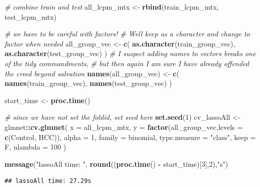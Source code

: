 \documentclass[
]{book}
\newenvironment{Shaded}{\begin{snugshade}}{\end{snugshade}}
\newcommand{\CommentTok}[1]{\textcolor[rgb]{0.56,0.35,0.01}{\textit{#1}}}
\newcommand{\DataTypeTok}[1]{\textcolor[rgb]{0.13,0.29,0.53}{#1}}
\newcommand{\DecValTok}[1]{\textcolor[rgb]{0.00,0.00,0.81}{#1}}
\newcommand{\KeywordTok}[1]{\textcolor[rgb]{0.13,0.29,0.53}{\textbf{#1}}}
\newcommand{\NormalTok}[1]{#1}
\newcommand{\OperatorTok}[1]{\textcolor[rgb]{0.81,0.36,0.00}{\textbf{#1}}}
\newcommand{\StringTok}[1]{\textcolor[rgb]{0.31,0.60,0.02}{#1}}
\begin{document}
\begin{Shaded}
\begin{Highlighting}[]
\CommentTok{\# combine train and test }
\NormalTok{all\_lcpm\_mtx <{-}}\StringTok{ }\KeywordTok{rbind}\NormalTok{(train\_lcpm\_mtx, test\_lcpm\_mtx)}

\CommentTok{\# we have to be careful with factors!}
\CommentTok{\# We\textquotesingle{}ll keep as a character and change to factor when needed}
\NormalTok{all\_group\_vec <{-}}\StringTok{ }\KeywordTok{c}\NormalTok{(}
 \KeywordTok{as.character}\NormalTok{(train\_group\_vec), }
 \KeywordTok{as.character}\NormalTok{(test\_group\_vec)}
\NormalTok{)}
\CommentTok{\# I suspect adding names to vectors breaks one of the tidy commandments,}
\CommentTok{\# but then again I am sure I have already offended the creed beyond salvation}
\KeywordTok{names}\NormalTok{(all\_group\_vec) <{-}}\StringTok{ }\KeywordTok{c}\NormalTok{(}
 \KeywordTok{names}\NormalTok{(train\_group\_vec),}
 \KeywordTok{names}\NormalTok{(test\_group\_vec)}
\NormalTok{)}

\NormalTok{start\_time <{-}}\StringTok{  }\KeywordTok{proc.time}\NormalTok{()}

\CommentTok{\# since we have not set the foldid, set seed here}
\KeywordTok{set.seed}\NormalTok{(}\DecValTok{1}\NormalTok{)}
\NormalTok{cv\_lassoAll <{-}}\StringTok{ }\NormalTok{glmnet}\OperatorTok{::}\KeywordTok{cv.glmnet}\NormalTok{(}
 \DataTypeTok{x =}\NormalTok{ all\_lcpm\_mtx,}
 \DataTypeTok{y =} \KeywordTok{factor}\NormalTok{(all\_group\_vec,}\DataTypeTok{levels =} \KeywordTok{c}\NormalTok{(}\StringTok{\textquotesingle{}Control\textquotesingle{}}\NormalTok{, }\StringTok{\textquotesingle{}HCC\textquotesingle{}}\NormalTok{)),}
 \DataTypeTok{alpha =} \DecValTok{1}\NormalTok{,}
 \DataTypeTok{family =} \StringTok{\textquotesingle{}binomial\textquotesingle{}}\NormalTok{,}
 \DataTypeTok{type.measure  =}  \StringTok{"class"}\NormalTok{,}
 \DataTypeTok{keep =}\NormalTok{ F,}
 \DataTypeTok{nlambda =} \DecValTok{100}
\NormalTok{)}

\KeywordTok{message}\NormalTok{(}\StringTok{"lassoAll time: "}\NormalTok{, }\KeywordTok{round}\NormalTok{((}\KeywordTok{proc.time}\NormalTok{() }\OperatorTok{{-}}\StringTok{ }\NormalTok{start\_time)[}\DecValTok{3}\NormalTok{],}\DecValTok{2}\NormalTok{),}\StringTok{"s"}\NormalTok{)}
\end{Highlighting}
\end{Shaded}

\begin{verbatim}
## lassoAll time: 27.29s
\end{verbatim}
\end{document}
